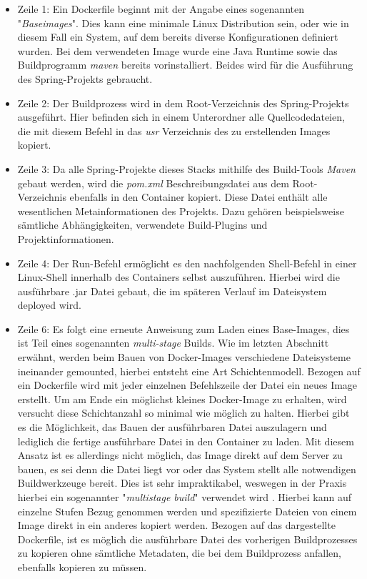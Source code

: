 \begin{itemize}

  \item Zeile 1: Ein Dockerfile beginnt mit der Angabe eines sogenannten "\emph{Baseimages}". Dies kann eine minimale Linux Distribution sein, oder wie in diesem Fall ein System, auf dem bereits diverse Konfigurationen definiert wurden. Bei dem verwendeten Image wurde eine Java Runtime sowie das Buildprogramm \emph{maven} bereits vorinstalliert. Beides wird für die Ausführung des Spring-Projekts gebraucht. 

  \item Zeile 2: Der Buildprozess wird in dem Root-Verzeichnis des Spring-Projekts ausgeführt. Hier befinden sich in einem Unterordner alle Quellcodedateien, die mit diesem Befehl in das \emph{usr} Verzeichnis des zu erstellenden Images kopiert. 
  
  \item Zeile 3: Da alle Spring-Projekte dieses Stacks mithilfe des Build-Tools \emph{Maven} gebaut werden, wird die \emph{pom.xml} Beschreibungsdatei aus dem Root-Verzeichnis ebenfalls in den Container kopiert. Diese Datei enthält alle wesentlichen Metainformationen des Projekts. Dazu gehören beispielsweise sämtliche Abhängigkeiten, verwendete Build-Plugins und Projektinformationen. 

  \item Zeile 4: Der Run-Befehl ermöglicht es den nachfolgenden Shell-Befehl in einer Linux-Shell innerhalb des Containers selbst auszuführen. Hierbei wird die ausführbare .jar Datei gebaut, die im späteren Verlauf im Dateisystem deployed wird.

  \item Zeile 6: Es folgt eine erneute Anweisung zum Laden eines Base-Images, dies ist Teil eines sogenannten \emph{multi-stage} Builds. Wie im letzten Abschnitt erwähnt, werden beim Bauen von Docker-Images verschiedene Dateisysteme ineinander gemounted, hierbei entsteht eine Art Schichtenmodell. Bezogen auf ein Dockerfile wird mit jeder einzelnen Befehlszeile der Datei ein neues Image erstellt. Um  am Ende ein möglichst kleines Docker-Image zu erhalten, wird versucht diese Schichtanzahl so minimal wie möglich zu halten. Hierbei gibt es die Möglichkeit, das Bauen der ausführbaren Datei auszulagern und lediglich die fertige ausführbare Datei in den Container zu laden. Mit diesem Ansatz ist es allerdings nicht möglich, das Image direkt auf dem Server zu bauen, es sei denn die Datei liegt vor oder das System stellt alle notwendigen Buildwerkzeuge bereit. Dies ist sehr impraktikabel, weswegen in der Praxis hierbei ein sogenannter "\emph{multistage build}" verwendet wird \label{it:multiBuild} \cite[Kapitel~multi stage build]{docker-doc}. Hierbei kann auf einzelne Stufen Bezug genommen werden und spezifizierte Dateien von einem Image direkt in ein anderes kopiert werden. Bezogen auf das dargestellte Dockerfile, ist es möglich die ausführbare Datei des vorherigen Buildprozesses zu kopieren ohne sämtliche Metadaten, die bei dem Buildprozess anfallen, ebenfalls kopieren zu müssen.


\end{itemize}
